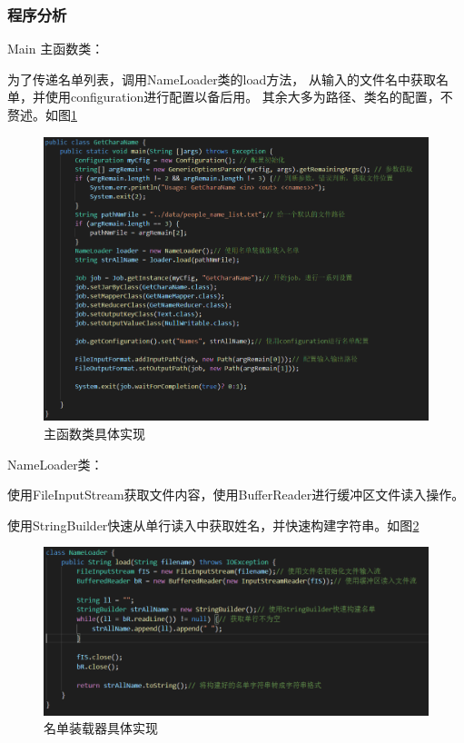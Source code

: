 \documentclass[a4paper,UTF8]{article}
\numberwithin{equation}{section}
\begin{document}
\subsubsection{程序分析}
Main 主函数类：
\par 为了传递名单列表，调用NameLoader类的load方法，
从输入的文件名中获取名单，并使用configuration进行配置以备后用。
其余大多为路径、类名的配置，不赘述。如图\ref{task1-Main}
\begin{figure}[htbp]
    \centering
    \includegraphics[width = 15cm]{task1-Main.png}
    \caption{主函数类具体实现}
    \label{task1-Main}
\end{figure}
\par NameLoader类：
\par 使用FileInputStream获取文件内容，使用BufferReader进行缓冲区文件读入操作。
\par 使用StringBuilder快速从单行读入中获取姓名，并快速构建字符串。如图\ref{task1-NameLoader}
\begin{figure}[htbp]
    \centering
    \includegraphics[width = 15cm]{task1-NameLoader.png}
    \caption{名单装载器具体实现}
    \label{task1-NameLoader}
\end{figure}
\end{document}

